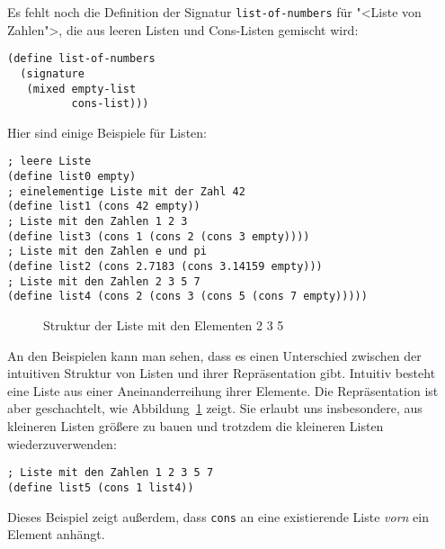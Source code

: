Es fehlt noch die Definition der Signatur \lstinline{list-of-numbers}
für "<Liste von Zahlen">, die aus leeren Listen und Cons-Listen
gemischt wird:
%
\begin{lstlisting}
(define list-of-numbers
  (signature
   (mixed empty-list
          cons-list)))
\end{lstlisting}
%
Hier sind einige Beispiele für Listen:
%
\begin{lstlisting}
; leere Liste
(define list0 empty)
; einelementige Liste mit der Zahl 42
(define list1 (cons 42 empty))
; Liste mit den Zahlen 1 2 3
(define list3 (cons 1 (cons 2 (cons 3 empty))))
; Liste mit den Zahlen e und pi
(define list2 (cons 2.7183 (cons 3.14159 empty)))
; Liste mit den Zahlen 2 3 5 7
(define list4 (cons 2 (cons 3 (cons 5 (cons 7 empty)))))
\end{lstlisting}
%
\begin{figure}[tb]
  \centering
  
  \caption{Struktur der Liste mit den Elementen 2 3 5}
  \label{fig:list-structure}
\end{figure}
%
\noindent An den Beispielen kann man sehen, dass es einen Unterschied
zwischen der intuitiven Struktur von Listen und ihrer Repräsentation
gibt. Intuitiv besteht eine Liste aus einer Aneinanderreihung ihrer
Elemente.  Die Repräsentation ist aber geschachtelt, wie
Abbildung~\ref{fig:list-structure} zeigt.  Sie erlaubt uns
insbesondere, aus kleineren Listen größere zu bauen und trotzdem die
kleineren Listen wiederzuverwenden:
%
\begin{lstlisting}
; Liste mit den Zahlen 1 2 3 5 7
(define list5 (cons 1 list4))
\end{lstlisting}
%
Dieses Beispiel zeigt außerdem, dass \lstinline{cons} an eine
existierende Liste \emph{vorn} ein Element anhängt.

